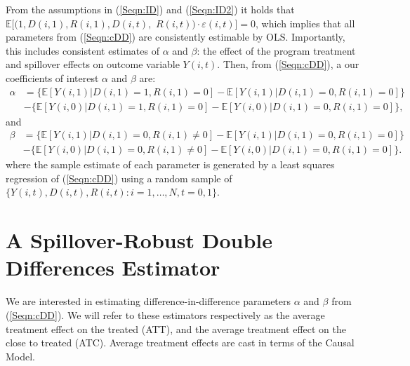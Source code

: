 From the assumptions in (\ref{Seqn:ID}) and (\ref{Seqn:ID2}) it holds that 
$\mathbb{E}[(1,D(i,1),R(i,1),D(i,t),$
$R(i,t))\cdot\varepsilon(i,t)]=0$, which 
implies that all parameters from (\ref{Seqn:cDD}) are consistently estimable 
by OLS.  Importantly, this includes consistent estimates of $\alpha$ and 
$\beta$: the effect of the program treatment and spillover effects on 
outcome variable $Y(i,t)$.  Then, from (\ref{Seqn:cDD}), a our coefficients 
of interest $\alpha$ and $\beta$ are:
\begin{equation}
\nonumber
\label{Seqn:DDa}
\begin{split}
\alpha&=\{\mathbb{E}[Y(i,1)|D(i,1)=1,R(i,1)=0]-\mathbb{E}[Y(i,1)|D(i,1)=0,R(i,1)=0]\} \\
      &-\{\mathbb{E}[Y(i,0)|D(i,1)=1,R(i,1)=0]-\mathbb{E}[Y(i,0)|D(i,1)=0,R(i,1)=0]\}, 
\end{split}
\end{equation}
and 
\begin{equation}
\nonumber
\label{Seqn:DDb}
\begin{split}
\beta&=\{\mathbb{E}[Y(i,1)|D(i,1)=0,R(i,1)\neq 0]-\mathbb{E}[Y(i,1)|D(i,1)=0,R(i,1)=0]\} \\
      &-\{\mathbb{E}[Y(i,0)|D(i,1)=0,R(i,1)\neq 0]-\mathbb{E}[Y(i,0)|D(i,1)=0,R(i,1)=0]\}. 
\end{split}
\end{equation}
where the sample estimate of each parameter is generated by a least squares
regression of (\ref{Seqn:cDD}) using a random sample of 
$\{Y(i,t), D(i,t), R(i,t): i=1, \ldots, N, t=0, 1\}$.

\section{A Spillover-Robust Double Differences Estimator}
\label{Sscn:estim}
We are interested in estimating difference-in-difference parameters $\alpha$ and 
$\beta$ from (\ref{Seqn:cDD}).  We will refer to these estimators respectively
as the average treatment effect on the treated (ATT), and the average treatment
effect on the close to treated (ATC).  Average treatment effects are cast in 
terms of the \citet{Rubin1974} Causal Model.

